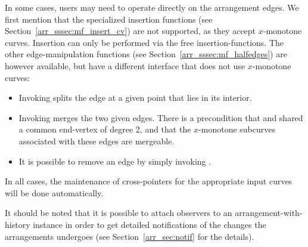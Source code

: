 In some cases, users may need to operate directly on the arrangement edges.
We first mention that the specialized insertion functions (see 
Section~\ref{arr_sssec:mf_insert_cv}) are not supported, as they accept
$x$-monotone curves. Insertion can only be performed via the free 
insertion-functions. The other edge-manipulation functions 
(see Section~\ref{arr_sssec:mf_halfedges}) are however available, but have 
a different interface that does not use $x$-monotone curves:
\begin{itemize}
\item Invoking  splits the edge  at a given point
 that lies in its interior.
\item Invoking  merges the two given edges. There is
a precondition that  and  shared a common end-vertex of degree
2, and that the $x$-monotone subcurves associated with these edges are
mergeable.
\item It is possible to remove an edge by simply invoking
.
\end{itemize}
In all cases, the maintenance of cross-pointers for the appropriate input
curves will be done automatically.

It should be noted that it is possible to attach observers to an 
arrangement-with-history instance in order to get detailed notifications of
the changes the arrangements undergoes (see Section~\ref{arr_sec:notif} for
the details).

